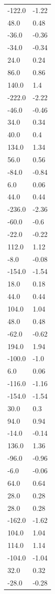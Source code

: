 \begin{longtable}{ll}
-122.0 & -1.22 \\
48.0 & 0.48 \\
-36.0 & -0.36 \\
-34.0 & -0.34 \\
24.0 & 0.24 \\
86.0 & 0.86 \\
140.0 & 1.4 \\
-222.0 & -2.22 \\
-46.0 & -0.46 \\
34.0 & 0.34 \\
40.0 & 0.4 \\
134.0 & 1.34 \\
56.0 & 0.56 \\
-84.0 & -0.84 \\
6.0 & 0.06 \\
44.0 & 0.44 \\
-236.0 & -2.36 \\
-60.0 & -0.6 \\
-22.0 & -0.22 \\
112.0 & 1.12 \\
-8.0 & -0.08 \\
-154.0 & -1.54 \\
18.0 & 0.18 \\
44.0 & 0.44 \\
104.0 & 1.04 \\
48.0 & 0.48 \\
-62.0 & -0.62 \\
194.0 & 1.94 \\
-100.0 & -1.0 \\
6.0 & 0.06 \\
-116.0 & -1.16 \\
-154.0 & -1.54 \\
30.0 & 0.3 \\
94.0 & 0.94 \\
-14.0 & -0.14 \\
136.0 & 1.36 \\
-96.0 & -0.96 \\
-6.0 & -0.06 \\
64.0 & 0.64 \\
28.0 & 0.28 \\
28.0 & 0.28 \\
-162.0 & -1.62 \\
104.0 & 1.04 \\
114.0 & 1.14 \\
-104.0 & -1.04 \\
32.0 & 0.32 \\
-28.0 & -0.28 \\

\end{longtable}
